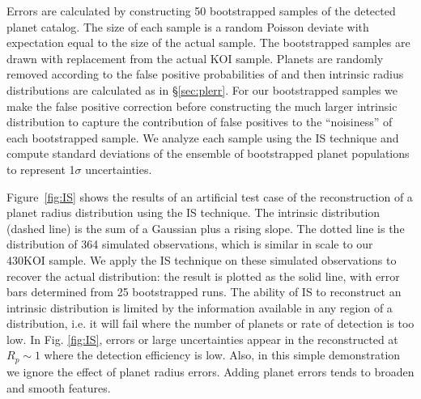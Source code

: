 Errors are calculated by constructing 50 bootstrapped samples of the
detected planet catalog.  The size of each sample is a random Poisson
deviate with expectation equal to the size of the actual sample.  The
bootstrapped samples are drawn with replacement from the actual
KOI sample.  Planets are randomly removed according to the false
positive probabilities of \citet{Fressin2013} and then intrinsic
radius distributions are calculated as in \S \ref{sec:plerr}.
For our bootstrapped samples we make the false positive correction 
before constructing the much larger intrinsic distribution to 
capture the contribution of false positives to the ``noisiness'' 
of each bootstrapped sample. We analyze each sample using the IS technique 
and compute standard deviations of the ensemble of bootstrapped
planet populations to represent 1$\sigma$ uncertainties.

Figure~\ref{fig:IS} shows the results of an artificial test case of
the reconstruction of a planet radius distribution using the IS technique.  
The intrinsic distribution (dashed line) is the sum of a Gaussian plus a
rising slope.  The dotted line is the distribution of 364 simulated 
observations, which is similar in scale to our
430KOI sample.  We apply the IS technique on these simulated
observations to recover the actual distribution: the result is plotted
as the solid line, with error bars determined from 25 bootstrapped
runs.  The ability of IS to reconstruct an intrinsic distribution is
limited by the information available in any region of a distribution,
i.e. it will fail where the number of planets or rate of detection is
too low.  In Fig. \ref{fig:IS}, errors or large uncertainties appear
in the reconstructed at $R_p \sim 1$\rearth{} where the detection
efficiency is low.  Also, in this simple demonstration we ignore the
effect of planet radius errors.  Adding planet errors tends to broaden
and smooth features.

